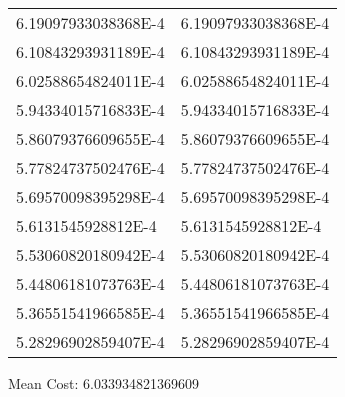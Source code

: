 \documentclass[12pt]{article}
\begin{document}
\begin{tabular}{l l}
6.19097933038368E-4	&	6.19097933038368E-4\\
6.10843293931189E-4	&	6.10843293931189E-4\\
6.02588654824011E-4	&	6.02588654824011E-4\\
5.94334015716833E-4	&	5.94334015716833E-4\\
5.86079376609655E-4	&	5.86079376609655E-4\\
5.77824737502476E-4	&	5.77824737502476E-4\\
5.69570098395298E-4	&	5.69570098395298E-4\\
5.6131545928812E-4	&	5.6131545928812E-4\\
5.53060820180942E-4	&	5.53060820180942E-4\\
5.44806181073763E-4	&	5.44806181073763E-4\\
5.36551541966585E-4	&	5.36551541966585E-4\\
5.28296902859407E-4	&	5.28296902859407E-4\\
\end{tabular}\newpage
\noindent
\noindent Mean Cost: 6.033934821369609\\
\end{document}
